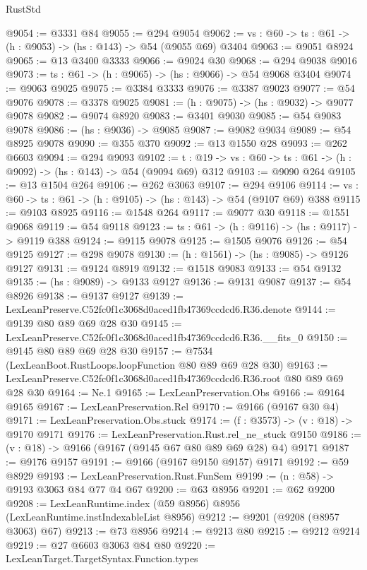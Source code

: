 \begin{lexlean}{RustStd}
\begin{coremodule}
@9054 := @3331 @84
@9055 := @294 @9054
@9062 := {vs : @60} -> {ts : @61} -> (h : @9053) -> (hs : @143) -> @54 (@9055 @69) @3404
@9063 := @9051 @8924
@9065 := @13 @3400 @3333
@9066 := @9024 @30
@9068 := @294 @9038 @9016
@9073 := {ts : @61} -> (h : @9065) -> (hs : @9066) -> @54 @9068 @3404
@9074 := @9063 @9025
@9075 := @3384 @3333
@9076 := @3387 @9023
@9077 := @54 @9076
@9078 := @3378 @9025
@9081 := (h : @9075) -> (hs : @9032) -> @9077 @9078
@9082 := @9074 @8920
@9083 := @3401 @9030
@9085 := @54 @9083 @9078
@9086 := (hs : @9036) -> @9085
@9087 := @9082 @9034
@9089 := @54 @8925 @9078
@9090 := @355 @370
@9092 := @13 @1550 @28
@9093 := @262 @6603
@9094 := @294 @9093
@9102 := {t : @19} -> {vs : @60} -> {ts : @61} -> (h : @9092) -> (hs : @143) -> @54 (@9094 @69) @312
@9103 := @9090 @264
@9105 := @13 @1504 @264
@9106 := @262 @3063
@9107 := @294 @9106
@9114 := {vs : @60} -> {ts : @61} -> (h : @9105) -> (hs : @143) -> @54 (@9107 @69) @388
@9115 := @9103 @8925
@9116 := @1548 @264
@9117 := @9077 @30
@9118 := @1551 @9068
@9119 := @54 @9118
@9123 := {ts : @61} -> (h : @9116) -> (hs : @9117) -> @9119 @388
@9124 := @9115 @9078
@9125 := @1505 @9076
@9126 := @54 @9125
@9127 := @298 @9078
@9130 := (h : @1561) -> (hs : @9085) -> @9126 @9127
@9131 := @9124 @8919
@9132 := @1518 @9083
@9133 := @54 @9132
@9135 := (hs : @9089) -> @9133 @9127
@9136 := @9131 @9087
@9137 := @54 @8926
@9138 := @9137 @9127
@9139 := LexLeanPreserve.C52fc0f1c3068d0aced1fb47369ccdcd6.R36.denote
@9144 := @9139 @80 @89 @69 @28 @30
@9145 := LexLeanPreserve.C52fc0f1c3068d0aced1fb47369ccdcd6.R36.__fits_0
@9150 := @9145 @80 @89 @69 @28 @30
@9157 := @7534 (LexLeanBoot.RustLoops.loopFunction @80 @89 @69 @28 @30)
@9163 := LexLeanPreserve.C52fc0f1c3068d0aced1fb47369ccdcd6.R36.root @80 @89 @69 @28 @30
@9164 := Ne.{1}
@9165 := LexLeanPreservation.Obs
@9166 := @9164 @9165
@9167 := LexLeanPreservation.Rel
@9170 := @9166 (@9167 @30 @4)
@9171 := LexLeanPreservation.Obs.stuck
@9174 := (f : @3573) -> (v : @18) -> @9170 @9171
@9176 := LexLeanPreservation.Rust.rel_ne_stuck @9150
@9186 := (v : @18) -> @9166 (@9167 (@9145 @67 @80 @89 @69 @28) @4) @9171
@9187 := @9176 @9157
@9191 := @9166 (@9167 @9150 @9157) @9171
@9192 := @59 @8929
@9193 := LexLeanPreservation.Rust.FunSem
@9199 := (n : @58) -> @9193 @3063 @84 @77 @4 @67
@9200 := @63 @8956
@9201 := @62 @9200
@9208 := LexLeanRuntime.index (@59 @8956) @8956 (LexLeanRuntime.instIndexableList @8956)
@9212 := @9201 (@9208 (@8957 @3063) @67)
@9213 := @73 @8956
@9214 := @9213 @80
@9215 := @9212 @9214
@9219 := @27 @6603 @3063 @84 @80
@9220 := LexLeanTarget.TargetSyntax.Function.types

\end{coremodule}
\end{lexlean}
